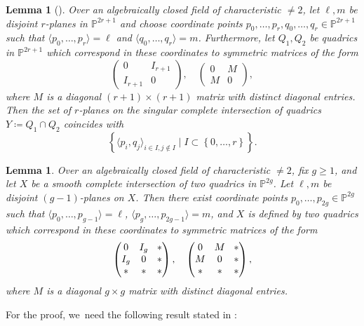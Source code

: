 \documentclass[10pt,a4paper]{amsart}
\theoremstyle{plain}
\newtheorem{lem}[thm]{Lemma}
\theoremstyle{definition}
\renewcommand\P{\mathbb{P}}
\begin{document}
\begin{lem}[{\cite[Lem.\,3.4]{Reid-thesis}}]\label{lem:reid_2}
Over an algebraically closed field of characteristic $\neq 2$, let $\ell, m$ be disjoint $r$-planes in $\P^{2r+1}$
and choose coordinate points $p_0,\dots, p_r, q_0,\dots, q_r\in \P^{2r+1}$ such that $\langle p_0,\dots,p_r\rangle=\ell$ and $\langle q_0,\dots, q_r\rangle =m$.
Furthermore, let $Q_1, Q_2$ be quadrics in $\P^{2r+1}$ which correspond in these coordinates to symmetric matrices of the form
\[
\begin{pmatrix}
0 & I_{r+1}\\
I_{r+1} & 0
\end{pmatrix}, \quad
\begin{pmatrix}
0 & M\\
M & 0
\end{pmatrix},
\]
where $M$ is a diagonal \((r+1)\times(r+1)\) matrix with distinct diagonal entries.
Then the set of $r$-planes on the singular complete intersection of quadrics $Y \coloneqq Q_1\cap Q_2$ coincides with
\[
\left\{\langle p_i, q_j\rangle_{i\in I, j\not\in I}\mid I\subset \left\{0,\dots, r\right\}
\right\}.
\]
\end{lem}

\begin{lem}\label{lem:reid-3}
Over an algebraically closed field of characteristic $\neq 2$,
fix $g\geq 1$, and let $X$ be a smooth complete intersection of two quadrics in $\P^{2g}$.
Let $\ell, m$ be disjoint $(g-1)$-planes on $X$.
Then there exist coordinate points $p_0,\dots, p_{2g}\in \P^{2g}$ such that $\langle p_0,\dots, p_{g-1}\rangle =\ell$, $\langle p_{g},\dots, p_{2g-1}\rangle=m$, and $X$ is defined by two quadrics which correspond in these coordinates to symmetric matrices of the form
\[\arraycolsep4.5pt
\begin{pmatrix}
0 & I_g & *\\
I_g & 0 & *\\
* & * & *
\end{pmatrix}, \quad
\begin{pmatrix}
0 & M & *\\
M & 0 & *\\
* & * & *
\end{pmatrix},
\]
where $M$ is a diagonal \(g\times g\) matrix with distinct diagonal entries.
\end{lem}

For the proof, we~need the following result stated in \cite[p.\,44]{Reid-thesis}:
\end{document}
